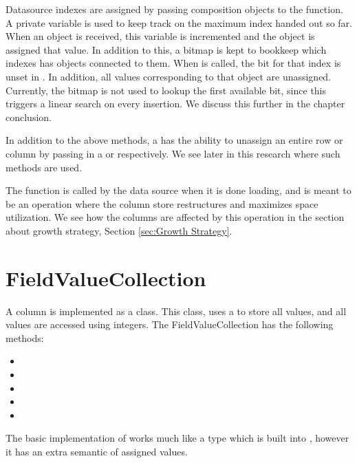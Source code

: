 Datasource indexes are assigned by passing composition objects to the   function. A private variable  is used to keep track on the maximum index handed out so far. When an object is received, this variable is incremented and the object is assigned that value. In addition to this, a bitmap  is kept to bookkeep which indexes has objects connected to them. When  is called, the bit for that index is unset in . In addition, all values corresponding to that object are unassigned. Currently, the  bitmap is not used to lookup the first available bit, since this triggers a linear search on every insertion. We discuss this further in the chapter conclusion.

In addition to the above methods, a  has the ability to unassign an entire row or column by passing in a  or  respectively. We see later in this research where such methods are used.

The  function is called by the data source when it is done loading, and is meant to be an operation where the column store restructures and maximizes space utilization. We see how the columns are affected by this operation in the section about growth strategy, Section \ref{sec:Growth Strategy}.


\section{FieldValueCollection}
\label{sec:FieldValueCollection}

A column is implemented as a  class. This class, uses a  to store all values, and all values are accessed using integers. The FieldValueCollection has the following methods:
\begin{itemize}
    \item {}
    \item {}
    \item {}
    \item {}
    \item {}
\end{itemize}

The basic implementation of  works much like a  type which is built into \delphi, however it has an extra semantic of assigned values.

